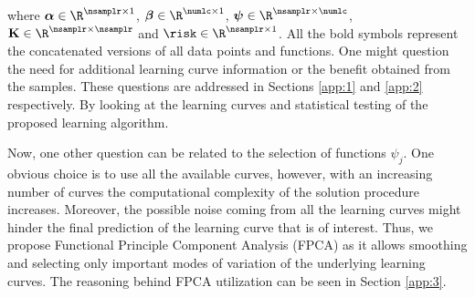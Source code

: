 where $\boldsymbol{\alpha}\in\R^{\nsamplr\times 1}$, $\boldsymbol{\beta}\in\R^{\numlc\times 1}$, $\boldsymbol{\psi}\in\R^{\nsamplr\times \numlc}$, $\mathbf{K}\in\R^{\nsamplr\times \nsamplr}$ and $\boldsymbol{\risk} \in\R^{\nsamplr\times 1}$. All the bold symbols represent the concatenated versions of all data points and functions. One might question the need for additional learning curve information or the benefit obtained from the samples. These questions are addressed in Sections \ref{app:1} and \ref{app:2} respectively. By looking at the learning curves and statistical testing of the proposed learning algorithm.

Now, one other question can be related to the selection of functions $\psi_j$. One obvious choice is to use all the available curves, however, with an increasing number of curves the computational complexity of the solution procedure increases. Moreover, the possible noise coming from all the learning curves might hinder the final prediction of the learning curve that is of interest. Thus, we propose Functional Principle Component Analysis (FPCA) as it allows smoothing and selecting only important modes of variation of the underlying learning curves. The reasoning behind FPCA utilization can be seen in Section \ref{app:3}.

